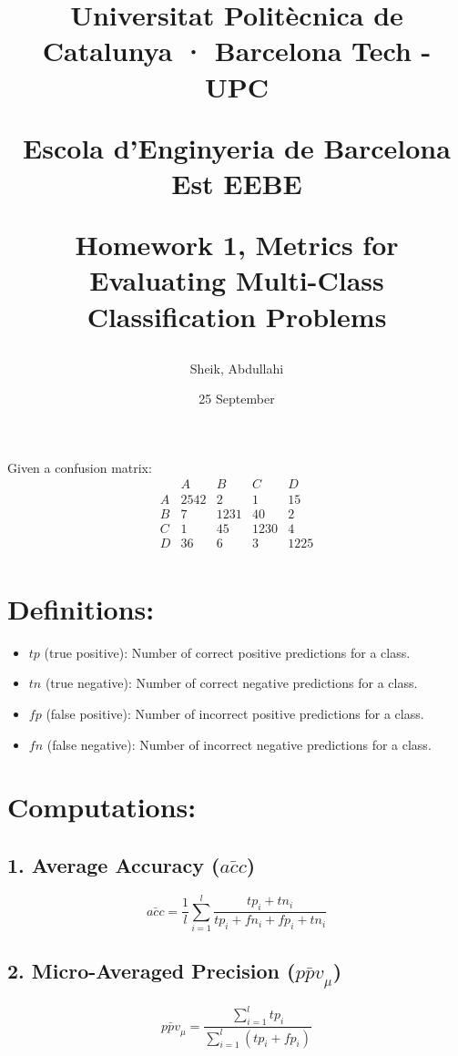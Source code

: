 \documentclass{article}
\begin{document}
\title{Universitat Politècnica de Catalunya · Barcelona Tech - UPC

Escola d'Enginyeria de Barcelona Est EEBE

Homework 1, Metrics for Evaluating Multi-Class Classification Problems}
\author{Sheik, Abdullahi}
\date{25 September}
\maketitle

Given a confusion matrix:
\[
\begin{array}{c|cccc}
& A & B & C & D \\
\hline
A & 2542 & 2 & 1 & 15 \\
B & 7 & 1231 & 40 & 2 \\
C & 1 & 45 & 1230 & 4 \\
D & 36 & 6 & 3 & 1225 \\
\end{array}
\]

\section*{Definitions:}
\begin{itemize}
    \item \(tp\) (true positive): Number of correct positive predictions for a class.
    \item \(tn\) (true negative): Number of correct negative predictions for a class.
    \item \(fp\) (false positive): Number of incorrect positive predictions for a class.
    \item \(fn\) (false negative): Number of incorrect negative predictions for a class.
\end{itemize}

\section*{Computations:}
\subsection*{1. Average Accuracy (\( \bar{acc} \))}
\[
\bar{acc} = \frac{1}{l} \sum_{i=1}^{l} \frac{tp_i + tn_i}{tp_i + fn_i + fp_i + tn_i}
\]

\subsection*{2. Micro-Averaged Precision (\( \bar{ppv}_\mu \))}
\[
\bar{ppv}_\mu = \frac{\sum_{i=1}^{l} tp_i}{\sum_{i=1}^{l} (tp_i + fp_i)}
\]
\end{document}

